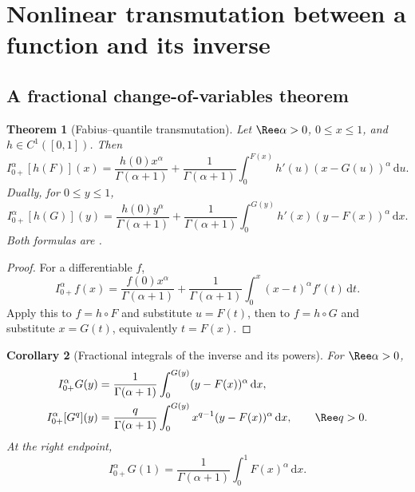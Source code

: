 \documentclass[11pt,oneside]{article}
\newtheorem{theorem}{Theorem}[section]
\newtheorem{corollary}[theorem]{Corollary}
\theoremstyle{definition}
\theoremstyle{remark}
\newcommand{\dd}{\,\mathrm d}
\newcommand{\1}{\mathbf 1}
\begin{document}
\section{Nonlinear transmutation between a function and its inverse}
\label{p7:sec:inverse}

\subsection{A fractional change-of-variables theorem}

\begin{theorem}[Fabius--quantile transmutation]
\label{p7:thm:quantile-transmutation}
Let $\Ree\alpha>0$, $0\le x\le1$, and $h\in C^1([0,1])$.  Then
\begin{equation}
 I_{0+}^{\alpha}[h(F)](x)
 =\frac{h(0)x^\alpha}{\Gamma(\alpha+1)}
 +\frac1{\Gamma(\alpha+1)}
 \int_0^{F(x)}h'(u)(x-G(u))^\alpha\dd u.
 \label{p7:eq:F-to-G-transmutation}
\end{equation}
Dually, for $0\le y\le1$,
\begin{equation}
 I_{0+}^{\alpha}[h(G)](y)
 =\frac{h(0)y^\alpha}{\Gamma(\alpha+1)}
 +\frac1{\Gamma(\alpha+1)}
 \int_0^{G(y)}h'(x)(y-F(x))^\alpha\dd x.
 \label{p7:eq:G-to-F-transmutation}
\end{equation}
Both formulas are \statusproved.
\end{theorem}

\begin{proof}
For a differentiable $f$,
\[
 I_{0+}^{\alpha}f(x)
 =\frac{f(0)x^\alpha}{\Gamma(\alpha+1)}
 +\frac1{\Gamma(\alpha+1)}\int_0^x(x-t)^\alpha f'(t)\dd t.
\]
Apply this to $f=h\circ F$ and substitute $u=F(t)$, then to $f=h\circ G$ and substitute
$x=G(t)$, equivalently $t=F(x)$.
\end{proof}

\begin{corollary}[Fractional integrals of the inverse and its powers]
\label{p7:cor:inverse-fractional-integral}
For $\Ree\alpha>0$,
\begin{align}
 I_{0+}^{\alpha}G(y)
 &=\frac1{\Gamma(\alpha+1)}
   \int_0^{G(y)}(y-F(x))^\alpha\dd x,\label{p7:eq:inverse-RL}\\
 I_{0+}^{\alpha}[G^q](y)
 &=\frac q{\Gamma(\alpha+1)}
   \int_0^{G(y)}x^{q-1}(y-F(x))^\alpha\dd x,
 \qquad \Ree q>0.\label{p7:eq:inverse-power-RL}
\end{align}
At the right endpoint,
\begin{equation}
 I_{0+}^{\alpha}G(1)
 =\frac1{\Gamma(\alpha+1)}\int_0^1F(x)^\alpha\dd x.
 \label{p7:eq:inverse-RL-endpoint}
\end{equation}
\end{corollary}
\end{document}
